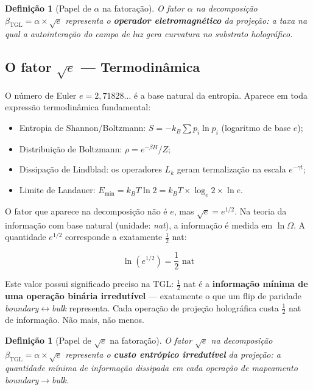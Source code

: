 \documentclass[12pt,a4paper,twoside]{article}
\newtheorem{definition}[theorem]{Definição}
\newcommand{\betatgl}{\beta_{\!\scriptscriptstyle\mathrm{TGL}}}
\newcommand{\boundary}{\textit{boundary}}
\newcommand{\bulk}{\textit{bulk}}
\begin{document}
\begin{definition}[Papel de $\alpha$ na fatoração]
O fator $\alpha$ na decomposição $\betatgl = \alpha \times \sqrt{e}$ representa o \textbf{operador eletromagnético} da projeção: a taxa na qual a autointeração do campo de luz gera curvatura no substrato holográfico.
\end{definition}

\subsection{O fator $\sqrt{e}$ --- Termodinâmica}

O número de Euler $e = 2{,}71828\ldots$ é a base natural da entropia. Aparece em toda expressão termodinâmica fundamental:

\begin{itemize}[nosep]
\item Entropia de Shannon/Boltzmann: $S = -k_B \sum p_i \ln p_i$ (logaritmo de base $e$);
\item Distribuição de Boltzmann: $\rho = e^{-\beta H} / Z$;
\item Dissipação de Lindblad: os operadores $L_k$ geram termalização na escala $e^{-\gamma t}$;
\item Limite de Landauer: $E_{\min} = k_B T \ln 2 = k_B T \times \log_e 2 \times \ln e$.
\end{itemize}

O fator que aparece na decomposição não é $e$, mas $\sqrt{e} = e^{1/2}$. Na teoria da informação com base natural (unidade: \textit{nat}), a informação é medida em $\ln \Omega$. A quantidade $e^{1/2}$ corresponde a exatamente $\frac{1}{2}$ nat:

\begin{equation}
\ln(e^{1/2}) = \frac{1}{2} \text{ nat}
\end{equation}

Este valor possui significado preciso na TGL: $\frac{1}{2}$ nat é a \textbf{informação mínima de uma operação binária irredutível} --- exatamente o que um flip de paridade \boundary$\leftrightarrow$\bulk{} representa. Cada operação de projeção holográfica custa $\frac{1}{2}$ nat de informação. Não mais, não menos.

\begin{definition}[Papel de $\sqrt{e}$ na fatoração]
O fator $\sqrt{e}$ na decomposição $\betatgl = \alpha \times \sqrt{e}$ representa o \textbf{custo entrópico irredutível} da projeção: a quantidade mínima de informação dissipada em cada operação de mapeamento \boundary$\to$\bulk.
\end{definition}
\end{document}
